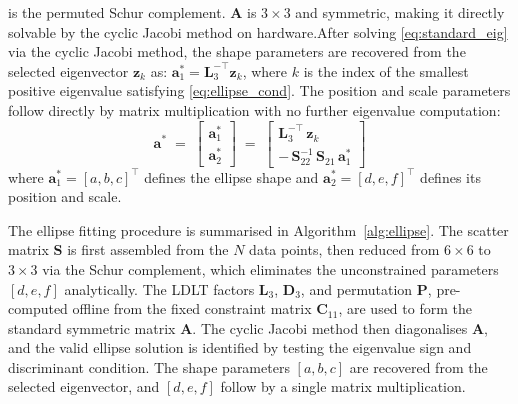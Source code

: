 \documentclass[colorlinks,upint,subscriptcorrection,varvw,hyphenate,balance,greek,russian,vietnamese,german]{asmeconf} %
\begin{document}
is the permuted Schur complement.
$\mathbf{A}$ is $3\times3$ and symmetric,
making it directly solvable by the cyclic Jacobi method on hardware.After solving \eqref{eq:standard_eig} via the cyclic Jacobi method,
the shape parameters are recovered from the selected eigenvector
$\mathbf{z}_k$ as:
$\mathbf{a}_1^* = \mathbf{L}_3^{-\top}\mathbf{z}_k$,
where $k$ is the index of the smallest positive eigenvalue
satisfying \eqref{eq:ellipse_cond}.
The position and scale parameters follow directly by matrix
multiplication with no further eigenvalue computation:
\begin{equation}
	\mathbf{a}^* \;=\;
	\begin{bmatrix}
		\mathbf{a}_1^* \\[4pt]
		\mathbf{a}_2^*
	\end{bmatrix}
	\;=\;
	\begin{bmatrix}
		\mathbf{L}_3^{-\top}\,\mathbf{z}_k \\[4pt]
		-\,\mathbf{S}_{22}^{-1}\,\mathbf{S}_{21}\,\mathbf{a}_1^*
	\end{bmatrix}
	\label{eq:final}
\end{equation}
where $\mathbf{a}_1^* = [a,b,c]^\top$ defines the ellipse shape
and $\mathbf{a}_2^* = [d,e,f]^\top$ defines its position and scale.

The ellipse fitting procedure is summarised in
Algorithm~\ref{alg:ellipse}.
The scatter matrix $\mathbf{S}$ is first assembled
from the $N$ data points, then reduced from $6\times6$
to $3\times3$ via the Schur complement, which eliminates
the unconstrained parameters $[d,e,f]$ analytically.
The LDLT factors $\mathbf{L}_3$, $\mathbf{D}_3$, and
permutation $\mathbf{P}$, pre-computed offline from the
fixed constraint matrix $\mathbf{C}_{11}$, are used to
form the standard symmetric matrix $\mathbf{A}$.
The cyclic Jacobi method then diagonalises $\mathbf{A}$,
and the valid ellipse solution is identified by testing
the eigenvalue sign and discriminant condition.
The shape parameters $[a,b,c]$ are recovered from the
selected eigenvector, and $[d,e,f]$ follow by a single
matrix multiplication.
\end{document}
